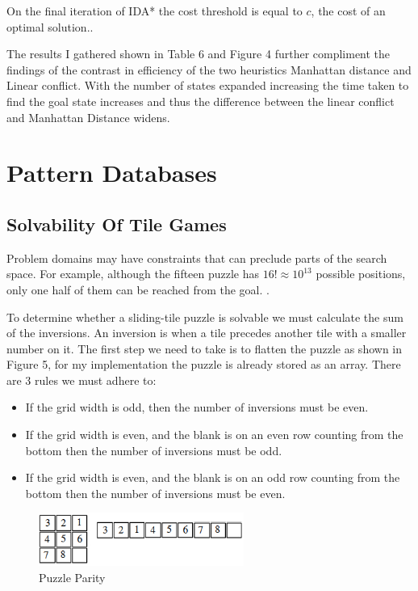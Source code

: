 \documentclass[final]{cmpreport}
\begin{document}
On the final iteration of IDA* the cost threshold is equal to $c$, the cost of an optimal solution.\citep{DBLP:journals/ai/KorfRE01}.

The results I gathered shown in Table 6 and Figure 4 further compliment the findings of the contrast in efficiency of the two heuristics Manhattan distance and Linear conflict. With the number of states expanded increasing the time taken to find the goal state increases and thus the difference between the linear conflict and Manhattan Distance widens.


\section{Pattern Databases}
\subsection{Solvability Of Tile Games}
Problem domains may have constraints that can preclude parts of the search space. For example, although the fifteen puzzle has $ 16! \approx 10^{13} $ possible positions, only one half of them can be reached from the goal. \citep{DBLP:journals/ci/CulbersonS98}. 

To determine whether a sliding-tile puzzle is solvable we must calculate the sum of the inversions.
An inversion is when a tile precedes another tile with a smaller number on it. The first step we need to take is to flatten the puzzle as shown in Figure 5, for my implementation the puzzle is already stored as an array.
There are 3 rules we must adhere to: \citep{WinNT}
\begin{itemize}
 	\item If the grid width is odd, then the number of inversions must be even.
	\item If the grid width is even, and the blank is on an even row counting from the bottom then the number of inversions must be odd.
	\item If the grid width is even, and the blank is on an odd row counting from the bottom then the number of inversions must be even. 
	
\end{itemize}




\begin{figure}[ht]
	\centering
	\includegraphics[width=0.6\textwidth]{parity}
	\captionsetup{justification=centering}
	\caption{Puzzle Parity}
\end{figure}
\end{document}

